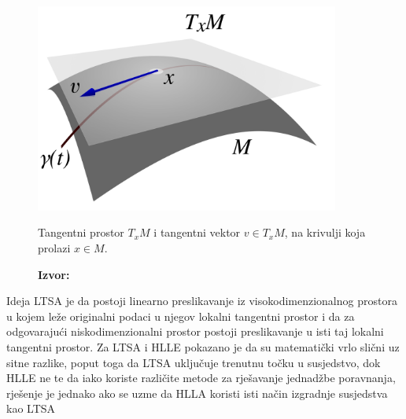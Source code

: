 \documentclass[times, utf8, diplomski]{fer}
\newcommand*{\captionsource}[2]{            %
    \RawFloats
    \caption{#1}
    \caption*{\textbf{Izvor:} #2}
}
\begin{document}
\bigskip
\begin{figure}[htb]
    \centering
    \includegraphics[width=10cm]{resources/images/reduction/tanget_space.png}
    \captionsource{Tangentni prostor $T_{x}M$ i tangentni vektor $v \in T_{x}M$, na krivulji koja prolazi $ x \in M$.}{\cite{wikimedia2008tangent}}
    \label{fig:tanget_space}
\end{figure}
\bigskip

Ideja LTSA je da postoji linearno preslikavanje iz visokodimenzionalnog prostora u kojem leže originalni podaci u njegov lokalni tangentni prostor i da za odgovarajući niskodimenzionalni prostor postoji preslikavanje u isti taj lokalni tangentni prostor. Za LTSA i HLLE pokazano je da su matematički vrlo slični uz sitne razlike, poput toga da LTSA uključuje trenutnu točku u susjedstvo, dok HLLE ne te da iako koriste različite metode za rješavanje jednadžbe poravnanja, rješenje je jednako ako se uzme da HLLA koristi isti način izgradnje susjedstva kao LTSA \citep{7837655}
\end{document}
